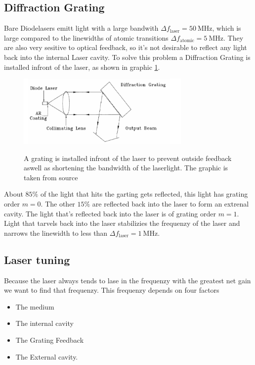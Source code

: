 \subsection{Diffraction Grating}
Bare Diodelasers emitt light with a large bandwith $\Delta f_\text{laser} = \SI{50}{\mega\Hz}$, which is large compared to the linewidths of atomic transitions $\Delta f_\text{atomic} = \SI{5}{\mega\Hz}$.
They are also very sesitive to optical feedback, so it's not desirable to reflect any light back into the internal Laser cavity.
To solve this problem a Diffraction Grating is installed infront of the laser, as shown in graphic \ref{fig:grating}.

\begin{figure}
    \centering
    \caption{A grating is installed infront of the laser to prevent outside feedback aswell as shortening the bandwidth of the laserlight. The graphic is taken from source \cite[5]{anleitung_laser}}
    \includegraphics[width=0.75\textwidth]{content/data/grating}
    \label{fig:grating}
\end{figure}

About $85\%$ of the light that hits the garting gets reflected, this light has grating order $m=0$.
The other $15\%$ are reflected back into the laser to form an extrenal cavity.
The light that's reflected back into the laser is of grating order $m=1$.
Light that tarvels back into the laser stabilizies the frequenzy of the laser and narrows the linewidth to less than $\Delta f_\text{laser} = \SI{1}{\mega\Hz}$.


\subsection{Laser tuning}
Because the laser always tends to lase in the frequenzy with the greatest net gain we want to find that frequenzy.
This frequenzy depends on four factors 

\begin{itemize}
    \item The medium
    \item The internal cavity
    \item The Grating Feedback
    \item The External cavity.
\end{itemize}

